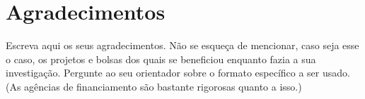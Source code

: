 \chapter*{Agradecimentos}
\setlength{\parskip}{1em}

Escreva aqui os seus agradecimentos. Não se esqueça de mencionar, caso seja esse o caso, os projetos e bolsas dos quais se beneficiou enquanto fazia a sua investigação. Pergunte ao seu orientador sobre o formato específico a ser usado. (As agências de financiamento são bastante rigorosas quanto a isso.)

\setlength{\parskip}{0em}